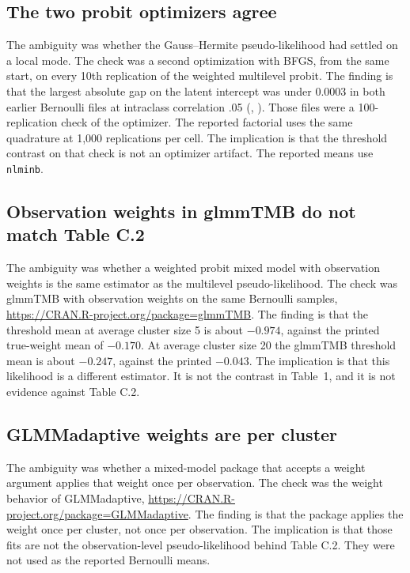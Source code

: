 \subsection{The two probit optimizers agree}

The ambiguity was whether the Gauss--Hermite pseudo-likelihood had settled on
a local mode.
The check was a second optimization with BFGS, from the same start, on every
10th replication of the weighted multilevel probit.
The finding is that the largest absolute gap on the latent intercept was
under 0.0003 in both earlier Bernoulli files at intraclass correlation .05
(,
).
Those files were a 100-replication check of the optimizer.
The reported factorial uses the same quadrature at 1,000 replications per cell.
The implication is that the threshold contrast on that check is not an
optimizer artifact.
The reported means use \texttt{nlminb}.

\subsection{Observation weights in glmmTMB do not match Table C.2}

The ambiguity was whether a weighted probit mixed model with observation
weights is the same estimator as the multilevel pseudo-likelihood.
The check was glmmTMB with observation weights on the same Bernoulli samples,
\url{https://CRAN.R-project.org/package=glmmTMB}.
The finding is that the threshold mean at average cluster size 5 is about
$-0.974$, against the printed true-weight mean of $-0.170$.
At average cluster size 20 the glmmTMB threshold mean is about $-0.247$,
against the printed $-0.043$.
The implication is that this likelihood is a different estimator.
It is not the contrast in Table~1, and it is not evidence against Table C.2.

\subsection{GLMMadaptive weights are per cluster}

The ambiguity was whether a mixed-model package that accepts a weight argument
applies that weight once per observation.
The check was the weight behavior of GLMMadaptive,
\url{https://CRAN.R-project.org/package=GLMMadaptive}.
The finding is that the package applies the weight once per cluster, not once
per observation.
The implication is that those fits are not the observation-level
pseudo-likelihood behind Table C.2.
They were not used as the reported Bernoulli means.

